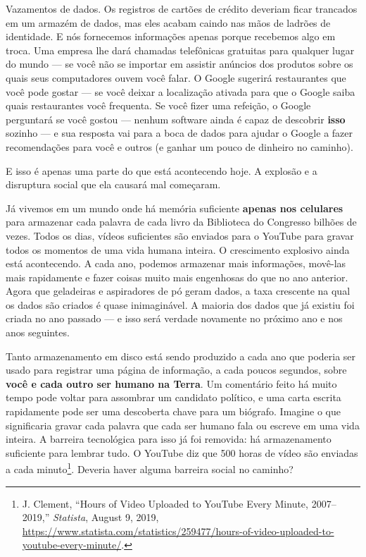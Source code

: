 Vazamentos de dados. Os registros de cartões de crédito deveriam ficar trancados 
em um armazém de dados, mas eles acabam caindo nas mãos de ladrões de 
identidade. E nós fornecemos informações apenas porque recebemos algo em troca. 
Uma empresa lhe dará chamadas telefônicas gratuitas para qualquer lugar do mundo 
--- se você não se importar em assistir anúncios dos produtos sobre os quais 
seus computadores ouvem você falar. O Google sugerirá restaurantes que você pode 
gostar --- se você deixar a localização ativada para que o Google saiba quais 
restaurantes você frequenta. Se você fizer uma refeição, o Google perguntará se 
você gostou --- nenhum software ainda é capaz de descobrir \textbf{isso} sozinho
--- e sua resposta vai para a boca de dados para ajudar o Google a fazer
recomendações para você e outros (e ganhar um pouco de dinheiro no caminho).

E isso é apenas uma parte do que está acontecendo hoje. A explosão e a 
disruptura social que ela causará mal começaram.

Já vivemos em um mundo onde há memória suficiente \textbf{apenas nos celulares}
para armazenar cada palavra de cada livro da Biblioteca do Congresso bilhões de 
vezes. Todos os dias, vídeos suficientes são enviados para o YouTube para gravar 
todos os momentos de uma vida humana inteira. O crescimento explosivo ainda está 
acontecendo. A cada ano, podemos armazenar mais informações, movê-las mais 
rapidamente e fazer coisas muito mais engenhosas do que no ano anterior. Agora 
que geladeiras e aspiradores de pó geram dados, a taxa crescente na qual os 
dados são criados é quase inimaginável. A maioria dos dados que já existiu foi 
criada no ano passado --- e isso será verdade novamente no próximo ano e nos 
anos seguintes.

Tanto armazenamento em disco está sendo produzido a cada ano que poderia ser 
usado para registrar uma página de informação, a cada poucos segundos, sobre 
\textbf{você e cada outro ser humano na Terra}. Um comentário feito há muito 
tempo pode voltar para assombrar um candidato político, e uma carta escrita 
rapidamente pode ser uma descoberta chave para um biógrafo. Imagine o que 
significaria gravar cada palavra que cada ser humano fala ou escreve em uma 
vida inteira. A barreira tecnológica para isso já foi removida: há armazenamento 
suficiente para lembrar tudo. O YouTube diz que 500 horas de vídeo são enviadas 
a cada minuto\footnote{J. Clement, ``Hours of Video Uploaded to YouTube Every
Minute, 2007–2019,'' \textit{Statista}, August 9, 2019, \url{https://www.statista.com/statistics/259477/hours-of-video-uploaded-to-youtube-every-minute/}.}. Deveria haver alguma
barreira social no caminho?

